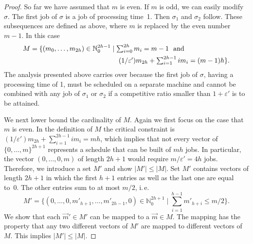 \documentclass{llncs}
\newcommand{\eps}{\varepsilon}
\begin{document}
\begin{proof}
So far we have assumed that $m$ is even. If $m$ is odd, we can easily modify $\sigma$. The first job 
of $\sigma$ is a job of processing time~1. Then $\sigma_1$ and $\sigma_2$ follow. These subsequences
are defined as above, where $m$ is replaced by the even number $m-1$. In this case 
\begin{eqnarray*}
\lefteqn{\textstyle{M = \{(m_0, \ldots, m_{2h}) \in \mathbb{N}_0^{2h-1} \mid  \sum_{i=0}^{2h} m_i = m-1 \ \ \mbox{and}}}\\
& & \hspace{4.6cm} \textstyle{(1/\eps')m_{2h} + \sum_{i=1}^{2h-1} i m_i = (m-1)h\}.}
\end{eqnarray*}
The analysis presented above carries over because the first job of $\sigma$, having a processing time of 1,
must be scheduled on a separate machine and cannot be combined with any job of $\sigma_1$ or $\sigma_2$ if a competitive 
ratio smaller than $1+\eps'$ is to be attained. 

We next lower bound the cardinality of $M$. Again we first focus on the case that $m$ is even. In the definition of
$M$ the critical constraint is $(1/\eps')m_{2h} + \sum_{i=1}^{2h-1} i m_i = mh$, which implies that not every
vector of $\{0, \ldots, m\}^{2h+1}$ represents a schedule that can be built of $mh$ jobs. In particular, the 
vector $(0, \ldots, 0,m)$ of length $2h+1$ would require $m/\eps' = 4h$ jobs. Therefore, we introduce a set
$M'$ and show $|M'| \leq |M|$. Set $M'$ contains vectors of length $2h+1$ in which the first $h+1$ entries
as well as the last one are equal to~0. The other entries sum to at most $m/2$, i.\,e.\
$$\textstyle{M' = \{(0,\ldots, 0,m'_{h+1}, \ldots, m'_{2h-1},0) \in \mathbb{N}_0^{2h+1} \mid \sum_{i=1}^{h-1} m'_{h+i} \leq m/2\}.}$$
We show that each $\vec{m}'\in M'$ can be mapped to a $\vec{m}\in M$. The mapping has the property that
any two different vectors of $M'$ are mapped to different vectors of $M$. This implies $|M'| \leq |M|$.


\end{proof}
\end{document}
